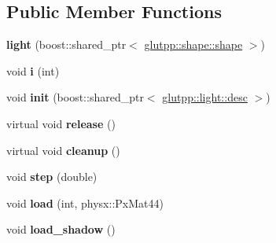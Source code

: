 \subsection*{\-Public \-Member \-Functions}
\begin{DoxyCompactItemize}
\item 
\hypertarget{classglutpp_1_1light_1_1light_aacc982b49ec38694baa92d89f43a90ff}{{\bfseries light} (boost\-::shared\-\_\-ptr$<$ \hyperlink{classglutpp_1_1shape_1_1shape}{glutpp\-::shape\-::shape} $>$)}\label{classglutpp_1_1light_1_1light_aacc982b49ec38694baa92d89f43a90ff}

\item 
\hypertarget{classglutpp_1_1light_1_1light_afb6aab641a407977f43393f1145e9ae9}{void {\bfseries i} (int)}\label{classglutpp_1_1light_1_1light_afb6aab641a407977f43393f1145e9ae9}

\item 
\hypertarget{classglutpp_1_1light_1_1light_a8ccf2f5bac2df4ed0b7e6e650158c058}{void {\bfseries init} (boost\-::shared\-\_\-ptr$<$ \hyperlink{classglutpp_1_1light_1_1desc}{glutpp\-::light\-::desc} $>$)}\label{classglutpp_1_1light_1_1light_a8ccf2f5bac2df4ed0b7e6e650158c058}

\item 
\hypertarget{classglutpp_1_1light_1_1light_a84dc2f6887e3423c6083c5c7117e5705}{virtual void {\bfseries release} ()}\label{classglutpp_1_1light_1_1light_a84dc2f6887e3423c6083c5c7117e5705}

\item 
\hypertarget{classglutpp_1_1light_1_1light_a2b84a85ec45ca3c1ce026b66fb0ae310}{virtual void {\bfseries cleanup} ()}\label{classglutpp_1_1light_1_1light_a2b84a85ec45ca3c1ce026b66fb0ae310}

\item 
\hypertarget{classglutpp_1_1light_1_1light_ad27fbd7b4fe66e9137ca3b465042c33f}{void {\bfseries step} (double)}\label{classglutpp_1_1light_1_1light_ad27fbd7b4fe66e9137ca3b465042c33f}

\item 
\hypertarget{classglutpp_1_1light_1_1light_af8e4d31c7bd65dd7f51f4813d946eb94}{void {\bfseries load} (int, physx\-::\-Px\-Mat44)}\label{classglutpp_1_1light_1_1light_af8e4d31c7bd65dd7f51f4813d946eb94}

\item 
\hypertarget{classglutpp_1_1light_1_1light_aa37d836e3b1ea0fbd44023482069e0b5}{void {\bfseries load\-\_\-shadow} ()}\label{classglutpp_1_1light_1_1light_aa37d836e3b1ea0fbd44023482069e0b5}


\end{DoxyCompactItemize}
